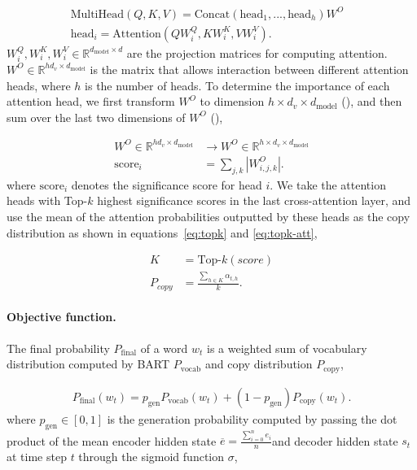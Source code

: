 \documentclass[11pt]{article}
\begin{document}
{
\vspace{-4mm}
\small
\begin{align}
    \text{MultiHead}(Q, K, V ) = \text{Concat}(\text{head}_1, ..., \text{head}_h)W^O& \\
    \text{head}_i = \text{Attention}(QW^Q_i, KW^K_i, VW^V_i).&
\end{align}
}
$W^Q_i, W^K_i, W^V_i \in \mathbb{R}^{d_{\text{model}} \times d}$ are the projection matrices for computing attention. $W^O \in \mathbb{R}^{hd_v \times d_\text{model}}$ is the matrix that allows interaction between different attention heads, where $h$ is the number of heads. To determine the importance of each attention head, we first transform $W^O$ to dimension $h \times d_v \times d_\text{model}$ (), and then sum over the last two dimensions of $W^O$ (), 

{
\small
\begin{align}
    W^O \in \mathbb{R}^{hd_v \times d_\text{model}} &\rightarrow 
    W^O \in \mathbb{R}^{h \times d_v \times d_\text{model}} \label{eq:transform} \\ 
    \text{score}_i &= \sum_{j, k} | W^O_{i, j, k} | \label{eq:compute_score}.
\end{align}
}
where $\text{score}_i$ denotes the significance score for head $i$. We take the attention heads with Top-$k$ highest significance scores in the last cross-attention layer, and use the mean of the attention probabilities outputted by these heads as the copy distribution as shown in equations~\ref{eq:topk} and \ref{eq:topk-att},

{
\vspace{-4mm}
\small
\begin{align}
    K &= \text{Top-}k(score) \label{eq:topk}\\
    P_{copy} &= \frac{\sum_{h \in K} \alpha_{t, h} }{k} \label{eq:topk-att}.
\end{align}
}
\paragraph{Objective function.}
The final probability $P_{\text{final}}$ of a word $w_t$ is a weighted sum of vocabulary distribution computed by \textsc{BART} $P_{\text{vocab}}$ and copy distribution $P_{\text{copy}}$,

{
\vspace{-4mm}
\small
\begin{align}
     P_{\text{final}}(w_t) = p_{\text{gen}}P_{\text{vocab}}(w_t) + (1 - p_{\text{gen}})P_{\text{copy}}(w_t).
\end{align}
}where $p_{\text{gen}} \in [0, 1]$ is the generation probability computed by passing the dot product of the mean encoder hidden state $\overline{e} = \frac{\sum^{n}_{i=0}e_i}{n}$and decoder hidden state $s_t$ at time step $t$ through the sigmoid function $\sigma$,
\end{document}
